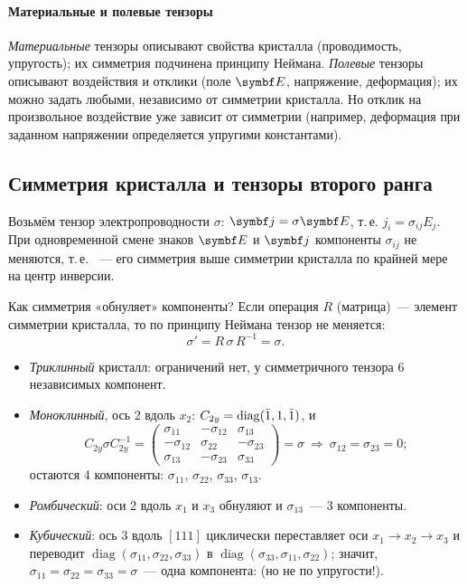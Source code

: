 \paragraph{Материальные и полевые тензоры}
\emph{Материальные} тензоры описывают свойства кристалла
(проводимость, упругость); их симметрия подчинена принципу Неймана.
\emph{Полевые} тензоры описывают воздействия и отклики (поле $\vb E$,
напряжение, деформация); их можно задать любыми, независимо от симметрии
кристалла. Но отклик на произвольное воздействие уже зависит от симметрии
(например, деформация при заданном напряжении определяется упругими
константами).

\subsection{Симметрия кристалла и тензоры второго ранга}\label{ssec:tensor2-symmetry}

Возьмём тензор электропроводности $\sigma$: $\vb j=\sigma\vb E$, т.\,е.
$j_i=\sigma_{ij}E_j$. При одновременной смене знаков $\vb E$ и $\vb j$
компоненты $\sigma_{ij}$ не меняются, т.\,е. ~— его симметрия
выше симметрии кристалла по крайней мере на центр инверсии.

Как симметрия «обнуляет» компоненты? Если операция $R$ (матрица)~—
элемент симметрии кристалла, то по принципу Неймана тензор не меняется:
\begin{equation}\label{eq:tensor-invariance}
\sigma'=R\,\sigma\,R^{-1}=\sigma .
\end{equation}
\begin{itemize}
\item \emph{Триклинный} кристалл: ограничений нет, у симметричного тензора
6 независимых компонент.
\item \emph{Моноклинный}, ось 2 вдоль $x_2$: $C_{2y}=\operatorname{diag}(\bar{1},1,\bar{1})$,
и
\[
C_{2y}\sigma C_{2y}^{-1}=\begin{pmatrix}\sigma_{11}&-\sigma_{12}&\sigma_{13}\\-\sigma_{12}&\sigma_{22}&-\sigma_{23}\\\sigma_{13}&-\sigma_{23}&\sigma_{33}\end{pmatrix}=\sigma
\ \Rightarrow\ \sigma_{12}=\sigma_{23}=0 ;
\]
остаются 4 компоненты: $\sigma_{11}$, $\sigma_{22}$, $\sigma_{33}$, $\sigma_{13}$.
\item \emph{Ромбический}: оси 2 вдоль $x_1$ и $x_3$ обнуляют и $\sigma_{13}$~— 3
компоненты.
\item \emph{Кубический}: ось 3 вдоль $[111]$ циклически переставляет оси
$x_1\to x_2\to x_3$ и переводит $\operatorname{diag}(\sigma_{11},\sigma_{22},\sigma_{33})$ в
$\operatorname{diag}(\sigma_{33},\sigma_{11},\sigma_{22})$; значит,
$\sigma_{11}=\sigma_{22}=\sigma_{33}=\sigma$~— одна компонента:  (но не по упругости!).
\end{itemize}


